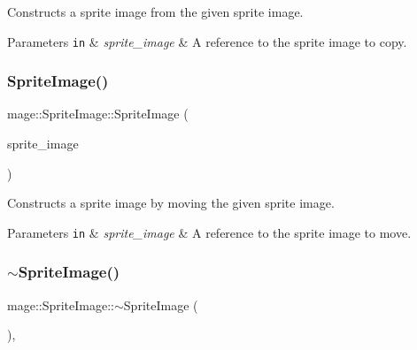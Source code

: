 Constructs a sprite image from the given sprite image.


\begin{DoxyParams}[1]{Parameters}
\mbox{\tt in}  & {\em sprite\+\_\+image} & A reference to the sprite image to copy. \\
\hline
\end{DoxyParams}
\hypertarget{classmage_1_1_sprite_image_ae1ea5c900498c8ecdf5dd3131d056dd5}{}\label{classmage_1_1_sprite_image_ae1ea5c900498c8ecdf5dd3131d056dd5} 
\subsubsection{\texorpdfstring{Sprite\+Image()}{SpriteImage()}\hspace{0.1cm}{\footnotesize\ttfamily [3/3]}}
{\footnotesize\ttfamily mage\+::\+Sprite\+Image\+::\+Sprite\+Image (\begin{DoxyParamCaption}\item[{\hyperlink{classmage_1_1_sprite_image}{Sprite\+Image} \&\&}]{sprite\+\_\+image }\end{DoxyParamCaption})\hspace{0.3cm}{\ttfamily [default]}}

Constructs a sprite image by moving the given sprite image.


\begin{DoxyParams}[1]{Parameters}
\mbox{\tt in}  & {\em sprite\+\_\+image} & A reference to the sprite image to move. \\
\hline
\end{DoxyParams}
\hypertarget{classmage_1_1_sprite_image_a9121ee110f7e64ee6e936e0d3350ab44}{}\label{classmage_1_1_sprite_image_a9121ee110f7e64ee6e936e0d3350ab44} 
\subsubsection{\texorpdfstring{$\sim$\+Sprite\+Image()}{~SpriteImage()}}
{\footnotesize\ttfamily mage\+::\+Sprite\+Image\+::$\sim$\+Sprite\+Image (\begin{DoxyParamCaption}{ }\end{DoxyParamCaption})\hspace{0.3cm}{\ttfamily [virtual]}, {\ttfamily [default]}}

